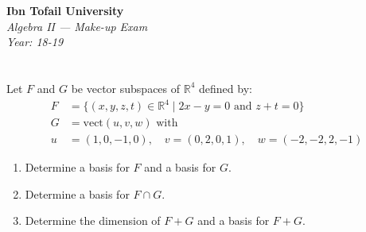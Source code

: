 \documentclass[12pt]{article}
\begin{document}
\begin{center}
  \Large\textbf{Ibn Tofail University} \\[1em]
  \large\textit{Algebra II — Make-up Exam} \\[0.5em]
  \large\textit{Year: 18-19} \\[2em]
\end{center}

\vspace{0.5cm}

\section{}
Let $F$ and $G$ be vector subspaces of $\mathbb{R}^4$ defined by:
\begin{align*}
F &= \{(x,y,z,t) \in \mathbb{R}^4 \mid 2x - y = 0 \text{ and } z + t = 0\} \\
G &= \text{vect}(u,v,w) \text{ with } \\
u &= (1,0,-1,0), \quad v = (0,2,0,1), \quad w = (-2,-2,2,-1)
\end{align*}

\begin{enumerate}
    \item Determine a basis for $F$ and a basis for $G$.
    \item Determine a basis for $F \cap G$.
    \item Determine the dimension of $F + G$ and a basis for $F + G$.
\end{enumerate}

\newpage
\end{document}
